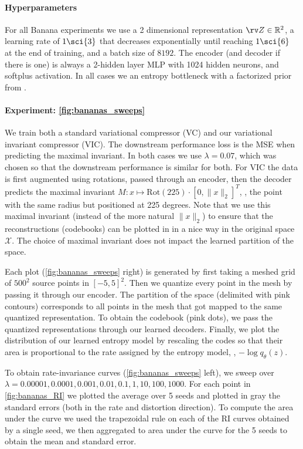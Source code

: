 \documentclass[final]{article}
\begin{document}
\paragraph{Hyperparameters}
For all Banana experiments we use a 2 dimensional representation $\rv Z \in  \mathbb{R}^2$, a learning rate of $1\sci{3}$ that decreases exponentially until reaching $1\sci{6}$ at the end of training, and a batch size of $8192$.
The encoder (and decoder if there is one) is always a 2-hidden layer MLP with 1024 hidden neurons, and softplus activation.
In all cases we an entropy bottleneck with a factorized prior from \cite{balle_variational_2018}.

\paragraph{Experiment: \cref{fig:bananas_sweeps}}
We train both a standard variational compressor (VC) and our variational invariant compressor (VIC).
The downstream performance loss is the MSE when predicting the maximal invariant.
In both cases we use $\lambda=0.07$, which was chosen so that the downstream performance is similar for both.
For VIC the data is first augmented using rotations, passed through an encoder, then the decoder predicts the maximal invariant $M: x \mapsto \mathrm{Rot}(225) \cdot [0,\|x\|_2]^T$, \ie, the point with the same radius but positioned at 225 degrees.
Note that we use this maximal invariant (instead of the more natural $\|x\|_2$) to ensure that the reconstructions (codebooks) can be plotted in in a nice way in the original space $\mathcal{X}$.
The choice of maximal invariant does not impact the learned partition of the space.

Each plot (\cref{fig:bananas_sweeps} right) is generated by first taking a meshed grid of $500^2$ source points in $[-5,5]^2$.
Then we quantize every point in the mesh by passing it through our encoder.
The partition of the space (delimited with pink contours) corresponds to all points in the mesh that got mapped to the same quantized representation.
To obtain the codebook (pink dots), we pass the quantized representations through our learned decoders.
Finally, we plot the distribution of our learned entropy model by rescaling the codes so that their area is proportional to the rate assigned by the entropy model, \ie, $- \log q_{\theta}(z)$.

To obtain rate-invariance curves (\cref{fig:bananas_sweeps} left), we  sweep over $\lambda=0.00001,0.0001,0.001,0.01,0.1,1,10,100,1000$.
For each point in \cref{fig:bananas_RI} we plotted the average over 5 seeds and plotted in gray the standard errors (both in the rate and distortion direction).
To compute the area under the curve we used the trapezoidal rule on each of the RI curves obtained by a single seed, we then aggregated to area under the curve for the 5 seeds to obtain the mean and standard error.
\end{document}
